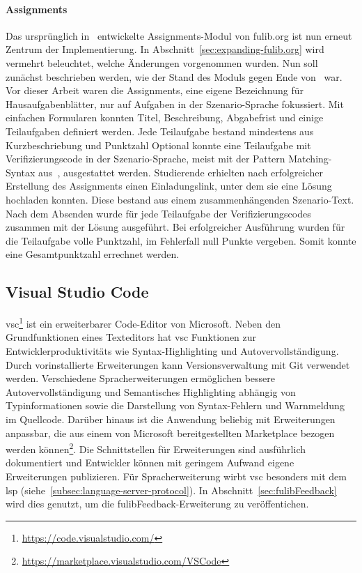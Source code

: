 \paragraph{Assignments}
Das ursprünglich in~\cite{bachelor-thesis} entwickelte Assignments-Modul von fulib.org ist nun erneut Zentrum der Implementierung.
In Abschnitt~\ref{sec:expanding-fulib.org} wird vermehrt beleuchtet, welche Änderungen vorgenommen wurden.
Nun soll zunächst beschrieben werden, wie der Stand des Moduls gegen Ende von~\cite{bachelor-thesis} war.
Vor dieser Arbeit waren die Assignments, eine eigene Bezeichnung für Hausaufgabenblätter, nur auf Aufgaben in der Szenario-Sprache fokussiert.
Mit einfachen Formularen konnten Titel, Beschreibung, Abgabefrist und einige Teilaufgaben definiert werden.
Jede Teilaufgabe bestand mindestens aus Kurzbeschriebung und Punktzahl
Optional konnte eine Teilaufgabe mit Verifizierungscode in der Szenario-Sprache, meist mit der Pattern Matching-Syntax aus~\cite{bachelor-thesis}, ausgestattet werden.
Studierende erhielten nach erfolgreicher Erstellung des Assignments einen Einladungslink, unter dem sie eine Lösung hochladen konnten.
Diese bestand aus einem zusammenhängenden Szenario-Text.
Nach dem Absenden wurde für jede Teilaufgabe der Verifizierungscodes zusammen mit der Lösung ausgeführt.
Bei erfolgreicher Ausführung wurden für die Teilaufgabe volle Punktzahl, im Fehlerfall null Punkte vergeben.
Somit konnte eine Gesamtpunktzahl errechnet werden.

\subsection{Visual Studio Code}\label{subsec:visual-studio-code}

\ac{vsc}\footnote{\url{https://code.visualstudio.com/}} ist ein erweiterbarer Code-Editor von Microsoft.
Neben den Grundfunktionen eines Texteditors hat \ac{vsc} Funktionen zur Entwicklerproduktivitäts wie Syntax-Highlighting und Autovervollständigung.
Durch vorinstallierte Erweiterungen kann Versionsverwaltung mit Git verwendet werden.
Verschiedene Spracherweiterungen ermöglichen bessere Autovervollständigung und Semantisches Highlighting abhängig von Typinformationen sowie die Darstellung von Syntax-Fehlern und Warnmeldung im Quellcode.
Darüber hinaus ist die Anwendung beliebig mit Erweiterungen anpassbar, die aus einem von Microsoft bereitgestellten Marketplace bezogen werden können\footnote{\url{https://marketplace.visualstudio.com/VSCode}}.
Die Schnittstellen für Erweiterungen sind ausführlich dokumentiert und Entwickler können mit geringem Aufwand eigene Erweiterungen publizieren.
Für Spracherweiterung wirbt \ac{vsc} besonders mit dem \ac{lsp} (siehe~\ref{subsec:language-server-protocol}).
In Abschnitt~\ref{sec:fulibFeedback} wird dies genutzt, um die fulibFeedback-Erweiterung zu veröffentichen.

